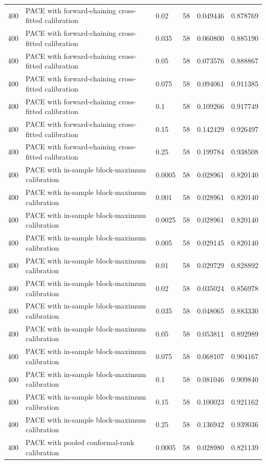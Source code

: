 \begin{tabular}{llllll}
400 & PACE with forward-chaining cross-fitted calibration & 0.02 & 58 & 0.049446 & 0.878769 \\
400 & PACE with forward-chaining cross-fitted calibration & 0.035 & 58 & 0.060800 & 0.885190 \\
400 & PACE with forward-chaining cross-fitted calibration & 0.05 & 58 & 0.073576 & 0.888867 \\
400 & PACE with forward-chaining cross-fitted calibration & 0.075 & 58 & 0.094061 & 0.911385 \\
400 & PACE with forward-chaining cross-fitted calibration & 0.1 & 58 & 0.109266 & 0.917749 \\
400 & PACE with forward-chaining cross-fitted calibration & 0.15 & 58 & 0.142429 & 0.926497 \\
400 & PACE with forward-chaining cross-fitted calibration & 0.25 & 58 & 0.199784 & 0.938508 \\
400 & PACE with in-sample block-maximum calibration & 0.0005 & 58 & 0.028961 & 0.820140 \\
400 & PACE with in-sample block-maximum calibration & 0.001 & 58 & 0.028961 & 0.820140 \\
400 & PACE with in-sample block-maximum calibration & 0.0025 & 58 & 0.028961 & 0.820140 \\
400 & PACE with in-sample block-maximum calibration & 0.005 & 58 & 0.029145 & 0.820140 \\
400 & PACE with in-sample block-maximum calibration & 0.01 & 58 & 0.029729 & 0.828892 \\
400 & PACE with in-sample block-maximum calibration & 0.02 & 58 & 0.035024 & 0.856978 \\
400 & PACE with in-sample block-maximum calibration & 0.035 & 58 & 0.048065 & 0.883330 \\
400 & PACE with in-sample block-maximum calibration & 0.05 & 58 & 0.053811 & 0.892989 \\
400 & PACE with in-sample block-maximum calibration & 0.075 & 58 & 0.068107 & 0.904167 \\
400 & PACE with in-sample block-maximum calibration & 0.1 & 58 & 0.081046 & 0.909840 \\
400 & PACE with in-sample block-maximum calibration & 0.15 & 58 & 0.100023 & 0.921162 \\
400 & PACE with in-sample block-maximum calibration & 0.25 & 58 & 0.136942 & 0.939036 \\
400 & PACE with pooled conformal-rank calibration & 0.0005 & 58 & 0.028980 & 0.821139 \\

\end{tabular}
